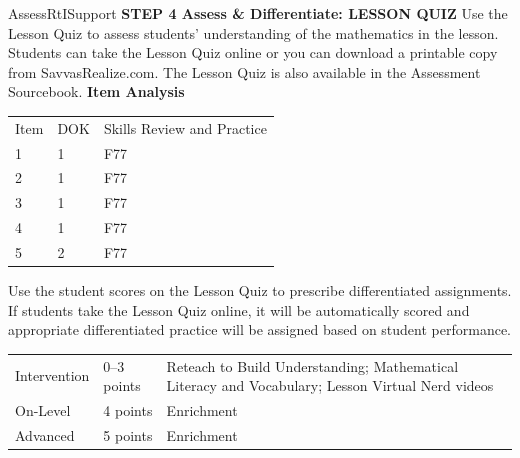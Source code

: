 \documentclass{article}
\newenvironment{te-addendum}[2]{}{}     %
\begin{document}
\begin{te-addendum}{Assess}{RtISupport}
\textbf{STEP 4 Assess & Differentiate: LESSON QUIZ}
Use the Lesson Quiz to assess students' understanding of the mathematics in the lesson.
Students can take the Lesson Quiz online or you can download a printable copy from SavvasRealize.com. The Lesson Quiz is also available in the Assessment Sourcebook.
\textbf{Item Analysis}
\begin{tabular}{lll}
Item & DOK & Skills Review and Practice \\
1 & 1 & F77 \\
2 & 1 & F77 \\
3 & 1 & F77 \\
4 & 1 & F77 \\
5 & 2 & F77 \\
\end{tabular}
Use the student scores on the Lesson Quiz to prescribe differentiated assignments.
If students take the Lesson Quiz online, it will be automatically scored and appropriate differentiated practice will be assigned based on student performance.
\begin{tabular}{lll}
Intervention & 0--3 points & Reteach to Build Understanding; Mathematical Literacy and Vocabulary; Lesson Virtual Nerd videos \\
On-Level & 4 points & Enrichment \\
Advanced & 5 points & Enrichment \\
\end{tabular}
\end{te-addendum}
\end{document}

